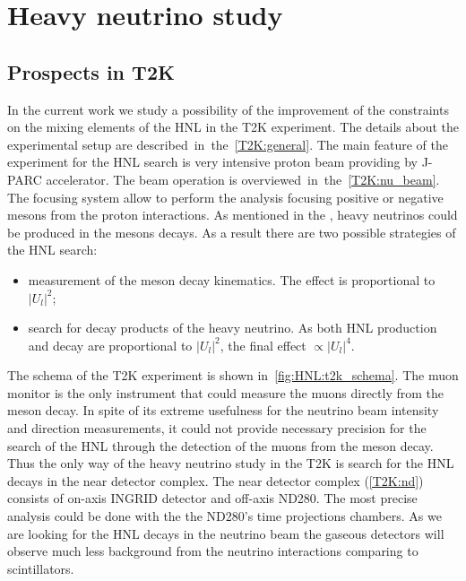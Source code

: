 \documentclass[../main.tex]{subfiles}
\begin{document}
\renewcommand{\labelitemi}{\ding{226}}
\renewcommand{\labelitemii}{\ding{227}}

\part{Heavy neutrino study}

\chapter{Prospects in T2K}


In the current work we study a possibility of the improvement of the constraints on the mixing elements of the HNL in the T2K experiment. The details about the experimental setup are described~in~the~\autoref{T2K:general}. The main feature of the experiment for the HNL search is very intensive proton beam providing by J-PARC accelerator. The beam operation is overviewed~in~the~\autoref{T2K:nu_beam}. The focusing system allow to perform the analysis focusing positive or negative mesons from the proton interactions. As mentioned in the , heavy neutrinos could be produced in the mesons decays. As a result there are two possible strategies of the HNL search:
\begin{itemize}
    \item measurement of the meson decay kinematics. The effect is proportional to $\left|U_l\right|^2$;
    \item search for decay products of the heavy neutrino. As both HNL production and decay are proportional to $\left|U_l\right|^2$, the final effect $\propto\left|U_l\right|^4$.
\end{itemize}

The schema of the T2K experiment is shown in~\autoref{fig:HNL:t2k_schema}. The muon monitor is the only instrument that could measure the muons directly from the meson decay. In spite of its extreme usefulness for the neutrino beam intensity and direction measurements, it could not provide necessary precision for the search of the HNL through the detection of the muons from the meson decay. Thus the only way of the heavy neutrino study in the T2K is search for the HNL decays in the near detector complex. The near detector complex (\autoref{T2K:nd}) consists of on-axis INGRID detector and off-axis ND280. The most precise analysis could be done with the the ND280's time projections chambers. As we are looking for the HNL decays in the neutrino beam the gaseous detectors will observe much less background from the neutrino interactions comparing to scintillators.
\end{document}
